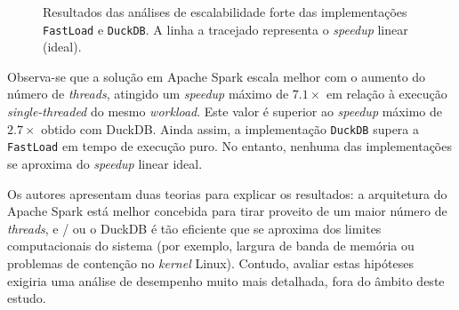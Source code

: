 \documentclass[11pt, a4paper]{article}
\begin{document}
\begin{figure}[H]
    \centering

    \caption{
        \onehalfspacing
        Resultados das análises de escalabilidade forte das implementações \texttt{FastLoad} e
        \texttt{DuckDB}. A linha a tracejado representa o \emph{speedup} linear (ideal).
    }
    \label{scalability-analyses}
\end{figure}

Observa-se que a solução em Apache Spark escala melhor com o aumento do número de \emph{threads},
atingido um \emph{speedup} máximo de $7.1\times$ em relação à execução \emph{single-threaded} do
mesmo \emph{workload}. Este valor é superior ao \emph{speedup} máximo de $2.7\times$ obtido com
DuckDB. Ainda assim, a implementação \texttt{DuckDB} supera a \texttt{FastLoad} em tempo de execução
puro. No entanto, nenhuma das implementações se aproxima do \emph{speedup} linear ideal.

Os autores apresentam duas teorias para explicar os resultados: a arquitetura do Apache Spark está
melhor concebida para tirar proveito de um maior número de \emph{threads}, e / ou o DuckDB é tão
eficiente que se aproxima dos limites computacionais do sistema (por exemplo, largura de banda de
memória ou problemas de contenção no \emph{kernel} Linux). Contudo, avaliar estas hipóteses exigiria
uma análise de desempenho muito mais detalhada, fora do âmbito deste estudo.
\end{document}
